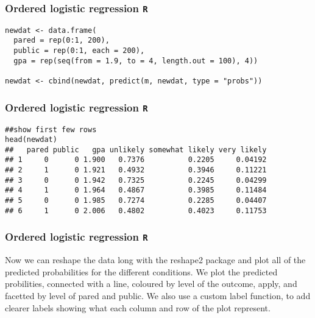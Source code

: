 \documentclass[00-GLMregslides.tex]{subfiles}
\begin{document}
\begin{frame}[fragile]
\frametitle{Ordered logistic regression \texttt{R} }
\Large
\begin{framed}
\begin{verbatim}
newdat <- data.frame(
  pared = rep(0:1, 200),
  public = rep(0:1, each = 200),
  gpa = rep(seq(from = 1.9, to = 4, length.out = 100), 4))

newdat <- cbind(newdat, predict(m, newdat, type = "probs"))

\end{verbatim}
\end{framed}

\end{frame}

\begin{frame}[fragile]
	\frametitle{Ordered logistic regression \texttt{R} }
	\Large
\begin{framed}
\begin{verbatim}
##show first few rows
head(newdat)
##   pared public   gpa unlikely somewhat likely very likely
## 1     0      0 1.900   0.7376          0.2205     0.04192
## 2     1      0 1.921   0.4932          0.3946     0.11221
## 3     0      0 1.942   0.7325          0.2245     0.04299
## 4     1      0 1.964   0.4867          0.3985     0.11484
## 5     0      0 1.985   0.7274          0.2285     0.04407
## 6     1      0 2.006   0.4802          0.4023     0.11753
\end{verbatim}
\end{framed}

\end{frame}

\begin{frame}[fragile]
	\frametitle{Ordered logistic regression \texttt{R} }
	\Large
Now we can reshape the data long with the reshape2 package and plot all of the predicted probabilities for the different conditions. We plot the predicted probilities, connected with a line, coloured by level of the outcome, apply, and facetted by level of pared and public. We also use a custom label function, to add clearer labels showing what each column and row of the plot represent.

\end{frame}
\end{document}
